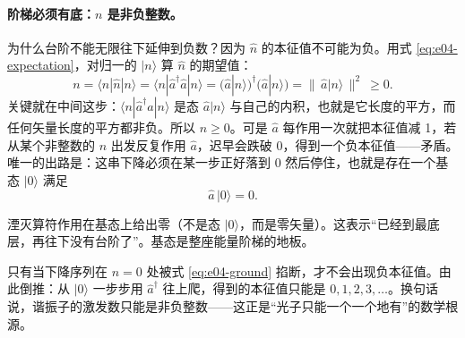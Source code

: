 \paragraph{阶梯必须有底：\(n\) 是非负整数。}
为什么台阶不能无限往下延伸到负数？因为 \(\hat n\) 的本征值不可能为负。用式 \eqref{eq:e04-expectation}，对归一的 \(|n\rangle\) 算 \(\hat n\) 的期望值：
\[
  n=\langle n|\hat n|n\rangle=\langle n|\hat a^\dagger\hat a|n\rangle
  =\big(\hat a|n\rangle\big)^\dagger\big(\hat a|n\rangle\big)
  =\big\|\,\hat a|n\rangle\,\big\|^2\ \ge 0 .
\]
关键就在中间这步：\(\langle n|\hat a^\dagger\hat a|n\rangle\) 是态 \(\hat a|n\rangle\) 与自己的内积，也就是它长度的平方，而任何矢量长度的平方都非负。所以 \(n\ge0\)。可是 \(\hat a\) 每作用一次就把本征值减 1，若从某个非整数的 \(n\) 出发反复作用 \(\hat a\)，迟早会跌破 0，得到一个负本征值——矛盾。唯一的出路是：这串下降必须在某一步正好落到 0 然后停住，也就是存在一个基态 \(|0\rangle\) 满足
\begin{equation}
  \hat a\,|0\rangle=0 .
  \label{eq:e04-ground}
\end{equation}
\begin{formulaexplain}
湮灭算符作用在基态上给出零（不是态 \(|0\rangle\)，而是零矢量）。这表示“已经到最底层，再往下没有台阶了”。基态是整座能量阶梯的地板。
\end{formulaexplain}
只有当下降序列在 \(n=0\) 处被式 \eqref{eq:e04-ground} 掐断，才不会出现负本征值。由此倒推：从 \(|0\rangle\) 一步步用 \(\hat a^\dagger\) 往上爬，得到的本征值只能是 \(0,1,2,3,\ldots\)。换句话说，谐振子的激发数只能是非负整数——这正是“光子只能一个一个地有”的数学根源。

